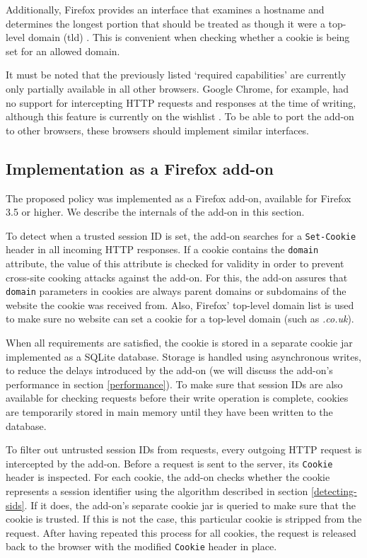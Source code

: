 Additionally, Firefox provides an interface that examines a hostname and determines the longest portion that should be treated as though it were a top-level domain (\gls{tld}) \cite{MozillaDevelopers2010}. This is convenient when checking whether a cookie is being set for an allowed domain.

It must be noted that the previously listed `required capabilities' are currently only partially available in all other browsers. Google Chrome, for example, had no support for intercepting HTTP requests and responses at the time of writing, although this feature is currently on the wishlist \cite{ChromiumWishlist}. To be able to port the add-on to other browsers, these browsers should implement similar interfaces.

\subsection{Implementation as a Firefox add-on}

The proposed policy was implemented as a Firefox add-on, available for Firefox 3.5 or higher. We describe the internals of the add-on in this section.

To detect when a trusted session ID is set, the add-on searches for a \texttt{Set-Cookie} header in all incoming HTTP responses. If a cookie contains the \texttt{domain} attribute, the value of this attribute is checked for validity in order to prevent cross-site cooking attacks \cite{Zalewski2006} against the add-on. For this, the add-on assures that \texttt{domain} parameters in cookies are always parent domains or subdomains of the website the cookie was received from. Also, Firefox' top-level domain list \cite{MozillaDevelopers2010} is used to make sure no website can set a cookie for a top-level domain (such as \emph{.co.uk}).

When all requirements are satisfied, the cookie is stored in a separate cookie jar implemented as a SQLite database. Storage is handled using asynchronous writes, to reduce the delays introduced by the add-on (we will discuss the add-on's performance in section \ref{performance}). To make sure that session IDs are also available for checking requests before their write operation is complete, cookies are temporarily stored in main memory until they have been written to the database.

To filter out untrusted session IDs from requests, every outgoing HTTP request is intercepted by the add-on. Before a request is sent to the server, its \texttt{Cookie} header is inspected. For each cookie, the add-on checks whether the cookie represents a session identifier using the algorithm described in section \ref{detecting-sids}. If it does, the add-on's separate cookie jar is queried to make sure that the cookie is trusted. If this is not the case, this particular cookie is stripped from the request. After having repeated this process for all cookies, the request is released back to the browser with the modified \texttt{Cookie} header in place.


